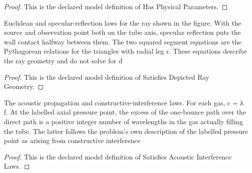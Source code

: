 \begin{proof}
  This is the declared model definition of Has Physical Parameters.
\end{proof}
\begin{definition}
  \label{def:physics:phyx-mini-0118:phyxminiproblems-problemphyxmini0118-satisfiesdepictedraygeometry}
  Euclidean and specular-reflection laws for the ray shown in the figure. With the source and observation point both on the tube axis, specular reflection puts the wall contact halfway between them. The two squared segment equations are the Pythagorean relations for the triangles with radial leg r. These equations describe the ray geometry and do not solve for d
\end{definition}
\begin{proof}
  This is the declared model definition of Satisfies Depicted Ray Geometry.
\end{proof}
\begin{definition}
  \label{def:physics:phyx-mini-0118:phyxminiproblems-problemphyxmini0118-satisfiesacousticinterferencelaws}
  The acoustic propagation and constructive-interference laws. For each gas, c = λ f. At the labelled axial pressure point, the excess of the one-bounce path over the direct path is a positive integer number of wavelengths in the gas actually filling the tube. The latter follows the problem's own description of the labelled pressure point as arising from constructive interference
\end{definition}
\begin{proof}
  This is the declared model definition of Satisfies Acoustic Interference Laws.
\end{proof}
